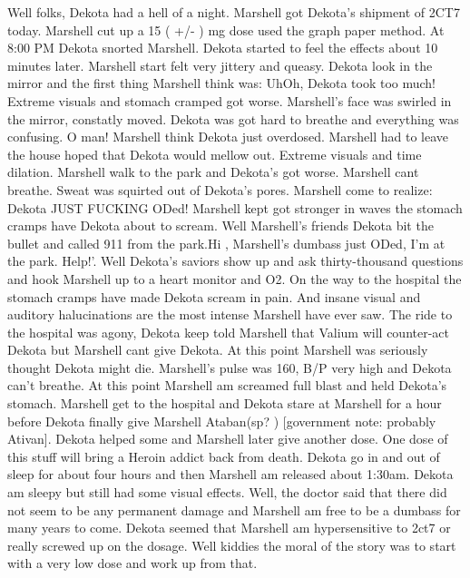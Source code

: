 \documentclass[12pt]{book}
\begin{document}
Well folks, Dekota had a hell of a night. Marshell got Dekota's shipment of 2CT7 today. Marshell cut up a 15 ( +/- ) mg dose used the graph paper method. At 8:00 PM Dekota snorted Marshell. Dekota started to feel the effects about 10 minutes later. Marshell start felt very jittery and queasy. Dekota look in the mirror and the first thing Marshell think was: UhOh, Dekota took too much! Extreme visuals and stomach cramped got worse. Marshell's face was swirled in the mirror, constatly moved. Dekota was got hard to breathe and everything was confusing. O man! Marshell think Dekota just overdosed. Marshell had to leave the house hoped that Dekota would mellow out. Extreme visuals and time dilation. Marshell walk to the park and Dekota's got worse. Marshell cant breathe. Sweat was squirted out of Dekota's pores. Marshell come to realize: Dekota JUST FUCKING ODed! Marshell kept got stronger in waves the stomach cramps have Dekota about to scream. Well Marshell's friends Dekota bit the bullet and called 911 from the park.Hi , Marshell's dumbass just ODed, I'm at the park. Help!'. Well Dekota's saviors show up and ask thirty-thousand questions and hook Marshell up to a heart monitor and O2. On the way to the hospital the stomach cramps have made Dekota scream in pain. And insane visual and auditory halucinations are the most intense Marshell have ever saw. The ride to the hospital was agony, Dekota keep told Marshell that Valium will counter-act Dekota but Marshell cant give Dekota. At this point Marshell was seriously thought Dekota might die. Marshell's pulse was 160, B/P very high and Dekota can't breathe. At this point Marshell am screamed full blast and held Dekota's stomach. Marshell get to the hospital and Dekota stare at Marshell for a hour before Dekota finally give Marshell Ataban(sp? ) [government note: probably Ativan]. Dekota helped some and Marshell later give another dose. One dose of this stuff will bring a Heroin addict back from death. Dekota go in and out of sleep for about four hours and then Marshell am released about 1:30am. Dekota am sleepy but still had some visual effects. Well, the doctor said that there did not seem to be any permanent damage and Marshell am free to be a dumbass for many years to come. Dekota seemed that Marshell am hypersensitive to 2ct7 or really screwed up on the dosage. Well kiddies the moral of the story was to start with a very low dose and work up from that.
\end{document}
